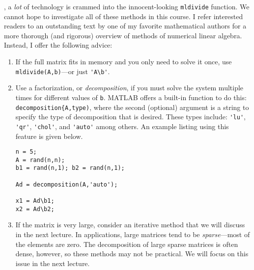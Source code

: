 , a \emph{lot} of technology is crammed into the innocent-looking \lstinline[style=myMatlab]{mldivide} function.  We cannot hope to investigate all of these methods in this course.  I refer interested readers to an outstanding text by one of my favorite mathematical authors for a more thorough (and rigorous) overview of methods of numerical linear algebra.\cite{trefethen2022numerical}  Instead, I offer the following advice:
\begin{enumerate}
\item If the full matrix fits in memory and you only need to solve it once, use \lstinline[style=myMatlab]{mldivide(A,b)}---or just \lstinline[style=myMatlab]{'A\b'}.
\item Use a factorization, or \emph{decomposition}, if you must solve the system multiple times for different values of \lstinline[style=myMatlab]{b}. MATLAB offers a built-in function to do this: \lstinline[style=myMatlab]{decomposition{A,type)}, where the second (optional) argument is a string to specify the type of decomposition that is desired.  These types include: \lstinline[style=myMatlab]{'lu'}, \lstinline[style=myMatlab]{'qr'}, \lstinline[style=myMatlab]{'chol'}, and \lstinline[style=myMatlab]{'auto'} among others. 
An example listing using this feature is given below.
\begin{lstlisting}[style=myMatlab]
n = 5;
A = rand(n,n);
b1 = rand(n,1); b2 = rand(n,1);

Ad = decomposition(A,'auto');

x1 = Ad\b1;
x2 = Ad\b2;
\end{lstlisting}

\item If the matrix is very large, consider an iterative method that we will discuss in the next lecture.  In applications, large matrices tend to be \emph{sparse}---most of the elements are zero. The decomposition of large sparse matrices is often dense, however, so these methods may not be practical.  We will focus on this issue in the next lecture. 

\end{enumerate}

